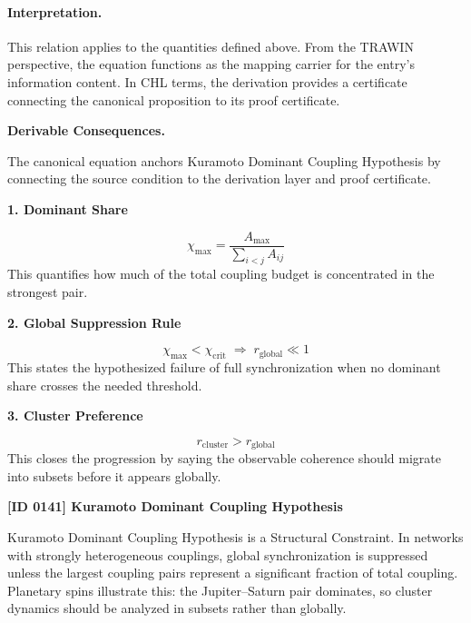 \paragraph{Interpretation.}
This relation applies to the quantities defined above. From the TRAWIN perspective, the equation functions as the mapping carrier for the entry’s information content. In CHL terms, the derivation provides a certificate connecting the canonical proposition to its proof certificate.

\par\vspace{0.35em}
\noindent\textbf{Derivable Consequences.}\quad
\begingroup
\footnotesize
\raggedright
The canonical equation anchors Kuramoto Dominant Coupling Hypothesis by connecting the source condition to the derivation layer and proof certificate.
\par\endgroup

\noindent\textbf{1. Dominant Share}\par
\[
\chi_{\max}=\frac{A_{\max}}{\sum_{i<j}A_{ij}}
\]
\noindent This quantifies how much of the total coupling budget is concentrated in the strongest pair.\par
\noindent\textbf{2. Global Suppression Rule}\par
\[
\chi_{\max}<\chi_{\mathrm{crit}}
\;\Longrightarrow\;
r_{\mathrm{global}}\ll 1
\]
\noindent This states the hypothesized failure of full synchronization when no dominant share crosses the needed threshold.\par
\noindent\textbf{3. Cluster Preference}\par
\[
r_{\mathrm{cluster}}>r_{\mathrm{global}}
\]
\noindent This closes the progression by saying the observable coherence should migrate into subsets before it appears globally.\par

\clearpage
\noindent\textbf{[ID 0141] Kuramoto Dominant Coupling Hypothesis}\par
\vspace{0.35em}
\begingroup\small
{}
Kuramoto Dominant Coupling Hypothesis is a Structural Constraint. In networks with strongly heterogeneous couplings, global synchronization is suppressed unless the largest coupling pairs represent a significant fraction of total coupling. Planetary spins illustrate this: the Jupiter--Saturn pair dominates, so cluster dynamics should be analyzed in subsets rather than globally.

